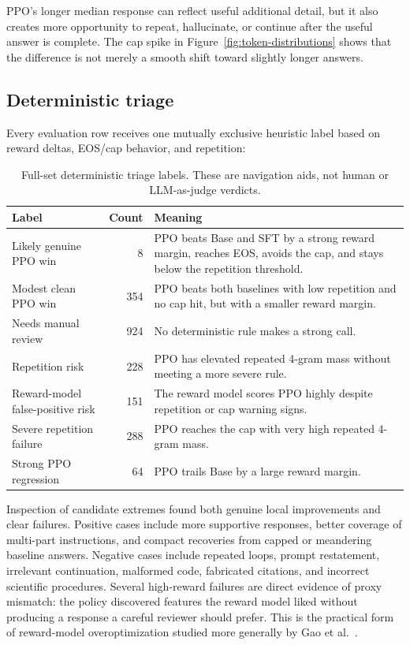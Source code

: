 \documentclass[11pt]{article}
\begin{document}
PPO's longer median response can reflect useful additional detail, but it also
creates more opportunity to repeat, hallucinate, or continue after the useful
answer is complete. The cap spike in Figure~\ref{fig:token-distributions}
shows that the difference is not merely a smooth shift toward slightly longer
answers.

\subsection{Deterministic triage}

Every evaluation row receives one mutually exclusive heuristic label based on
reward deltas, EOS/cap behavior, and repetition:

\begin{table}[H]
\centering
\small
\caption{Full-set deterministic triage labels. These are navigation aids, not
human or LLM-as-judge verdicts.}
\label{tab:triage}
\begin{tabularx}{\textwidth}{@{}Y r Y@{}}
\toprule
\textbf{Label} & \textbf{Count} & \textbf{Meaning}\\
\midrule
Likely genuine PPO win & 8 &
PPO beats Base and SFT by a strong reward margin, reaches EOS, avoids the cap,
and stays below the repetition threshold.\\
Modest clean PPO win & 354 &
PPO beats both baselines with low repetition and no cap hit, but with a
smaller reward margin.\\
Needs manual review & 924 &
No deterministic rule makes a strong call.\\
Repetition risk & 228 &
PPO has elevated repeated 4-gram mass without meeting a more severe rule.\\
Reward-model false-positive risk & 151 &
The reward model scores PPO highly despite repetition or cap warning signs.\\
Severe repetition failure & 288 &
PPO reaches the cap with very high repeated 4-gram mass.\\
Strong PPO regression & 64 &
PPO trails Base by a large reward margin.\\
\bottomrule
\end{tabularx}
\end{table}

Inspection of candidate extremes found both genuine local improvements and
clear failures. Positive cases include more supportive responses, better
coverage of multi-part instructions, and compact recoveries from capped or
meandering baseline answers. Negative cases include repeated loops, prompt
restatement, irrelevant continuation, malformed code, fabricated citations,
and incorrect scientific procedures. Several high-reward failures are direct
evidence of proxy mismatch: the policy discovered features the reward model
liked without producing a response a careful reviewer should prefer. This is
the practical form of reward-model overoptimization studied more generally by
Gao et al.\ \cite{gao2023}.
\end{document}
